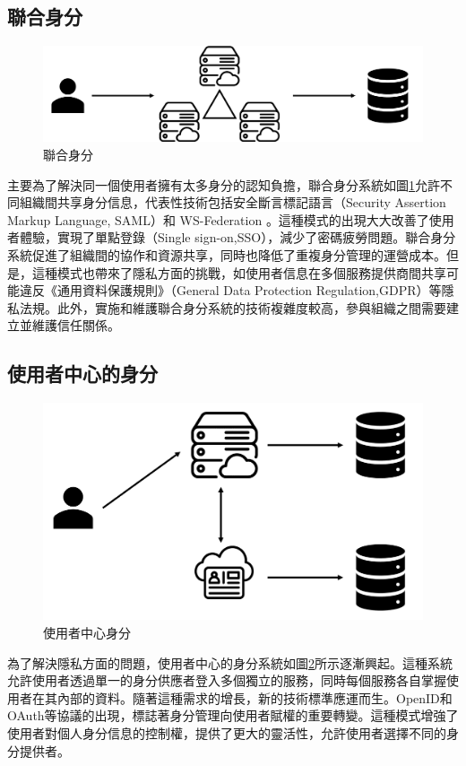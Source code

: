 \subsection{聯合身分}
\begin{figure}
  \centering
  \includegraphics[width=\linewidth,keepaspectratio]{figures/group-identity.png}
  \caption{聯合身分}
  \label{fig:group-identity}
\end{figure}
主要為了解決同一個使用者擁有太多身分的認知負擔，聯合身分系統如圖\ref{fig:group-identity}允許不同組織間共享身分信息，代表性技術包括安全斷言標記語言（Security Assertion Markup Language, SAML）和 WS-Federation \cite{oasis2005security, goodner2009web}。這種模式的出現大大改善了使用者體驗，實現了單點登錄（Single sign-on,SSO），減少了密碼疲勞問題。聯合身分系統促進了組織間的協作和資源共享，同時也降低了重複身分管理的運營成本。但是，這種模式也帶來了隱私方面的挑戰\cite{ahn2007user}，如使用者信息在多個服務提供商間共享可能違反《通用資料保護規則》（General Data Protection Regulation,GDPR）\cite{GDPR2016}等隱私法規。此外，實施和維護聯合身分系統的技術複雜度較高，參與組織之間需要建立並維護信任關係。
\subsection{使用者中心的身分}
\begin{figure}
  \centering
  \includegraphics[width=\linewidth,keepaspectratio]{figures/user-mid-identity.png}
  \caption{使用者中心身分}
  \label{fig:user-mid-identity}
\end{figure}
為了解決隱私方面的問題，使用者中心的身分系統如圖\ref{fig:user-mid-identity}所示逐漸興起。這種系統允許使用者透過單一的身分供應者登入多個獨立的服務，同時每個服務各自掌握使用者在其內部的資料。隨著這種需求的增長，新的技術標準應運而生。OpenID和OAuth等協議的出現\cite{sakimura2014openid, hardt2012oauth}，標誌著身分管理向使用者賦權的重要轉變。這種模式增強了使用者對個人身分信息的控制權，提供了更大的靈活性，允許使用者選擇不同的身分提供者。

